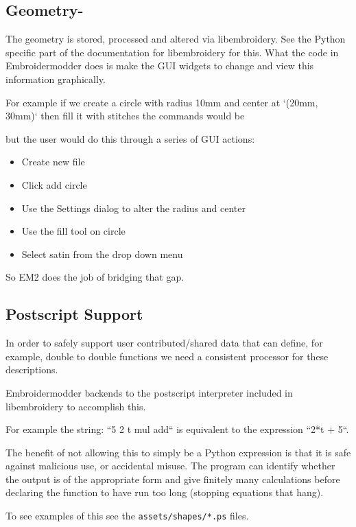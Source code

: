 \documentclass[a4paper]{report}
\begin{document}
\subsection{Geometry-}

The geometry is stored, processed and altered via libembroidery. See the Python specific part
of the documentation for libembroidery for this. What the code in Embroidermodder does is make
the GUI widgets to change and view this information graphically.

For example if we create a circle with radius 10mm and center at `(20mm, 30mm)` then fill it
with stitches the commands would be



but the user would do this through a series of GUI actions:

\begin{itemize}
\item Create new file
\item Click add circle
\item Use the Settings dialog to alter the radius and center
\item Use the fill tool on circle
\item Select satin from the drop down menu
\end{itemize}

So EM2 does the job of bridging that gap.

\subsection{Postscript Support}

In order to safely support user contributed/shared data that can define, for
example, double to double functions we need a consistent processor for these
descriptions.

Embroidermodder backends to the postscript interpreter included in libembroidery
to accomplish this.

For example the string: ``5 2 t mul add`` is equivalent to
the expression ``2*t + 5``.

The benefit of not allowing this to simply be a Python expression is that it is safe against
malicious use, or accidental misuse. The program can identify whether the output is of the
appropriate form and give finitely many calculations before declaring the function to have run
too long (stopping equations that hang).

To see examples of this see the \texttt{assets/shapes/*.ps} files.
\end{document}

